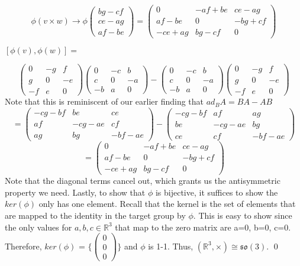 \documentclass{article}
\begin{document}
\[
\phi(v\times w)\longrightarrow \phi\begin{pmatrix}bg-cf\\ce-ag\\af-be\end{pmatrix} = \begin{pmatrix}0&-af+be&ce-ag\\af-be&0&-bg+cf\\-ce+ag&bg-cf&0\end{pmatrix}
\]
\begin{center}
    $[\phi(v),\phi(w)] = $
\end{center}
\[\begin{pmatrix}0&-g&f\\g&0&-e\\-f&e&0\end{pmatrix}\begin{pmatrix}0&-c&b\\c&0&-a\\-b&a&0\end{pmatrix}
- \begin{pmatrix}0&-c&b\\c&0&-a\\-b&a&0\end{pmatrix}\begin{pmatrix}0&-g&f\\g&0&-e\\-f&e&0\end{pmatrix}
\]
Note that this is reminiscent of our earlier finding that $ad_{B}A = BA-AB$
\[
= \begin{pmatrix}-cg-bf&be&ce\\af&-cg-ae&cf\\ag&bg&-bf-ae\end{pmatrix} - \begin{pmatrix}-cg-bf&af&ag\\be&-cg-ae&bg\\ce&cf&-bf-ae\end{pmatrix}
\]
\[
= \begin{pmatrix}0&-af+be&ce-ag\\af-be&0&-bg+cf\\-ce+ag&bg-cf&0\end{pmatrix}
\]
Note that the diagonal terms cancel out, which grants us the antisymmetric property we need.
Lastly, to show that $\phi$ is bijective, it suffices to show the $ker(\phi)$ only has one element.
Recall that the kernel is the set of elements that are mapped to the identity in the target group by $\phi$.
This is easy to show since the only values for $a,b,c \in \mathbb{R}^3$ that map to the zero matrix are a=0, b=0, c=0. Therefore, $ker(\phi)$ = $\{\begin{pmatrix}0\\0\\0\end{pmatrix}\}$ and $\phi$ is 1-1. Thus, $(\mathbb{R}^3,\times)\cong \mathfrak{so}(3)$. \qed
\end{document}
